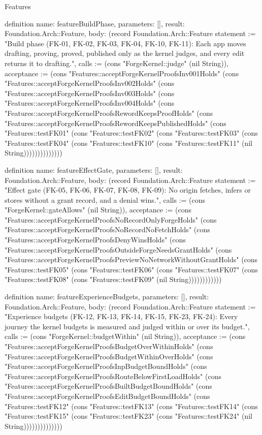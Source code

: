 \begin{lexlean}{Features}
\begin{semanticmodule}
definition{
  name: featureBuildPhase,
  parameters: [],
  result: Foundation.Arch::Feature,
  body: (record Foundation.Arch::Feature {statement := "Build phase (FK-01, FK-02, FK-03, FK-04, FK-10, FK-11): Each app moves drafting, proving, proved, published only as the kernel judges, and every edit returns it to drafting.", calls := (cons "ForgeKernel::judge" (nil String)), acceptance := (cons "Features::acceptForgeKernelProofsInv001Holds" (cons "Features::acceptForgeKernelProofsInv002Holds" (cons "Features::acceptForgeKernelProofsInv003Holds" (cons "Features::acceptForgeKernelProofsInv004Holds" (cons "Features::acceptForgeKernelProofsRewordKeepsProofHolds" (cons "Features::acceptForgeKernelProofsRewordKeepsPublishedHolds" (cons "Features::testFK01" (cons "Features::testFK02" (cons "Features::testFK03" (cons "Features::testFK04" (cons "Features::testFK10" (cons "Features::testFK11" (nil String)))))))))))))})
}

definition{
  name: featureEffectGate,
  parameters: [],
  result: Foundation.Arch::Feature,
  body: (record Foundation.Arch::Feature {statement := "Effect gate (FK-05, FK-06, FK-07, FK-08, FK-09): No origin fetches, infers or stores without a grant record, and a denial wins.", calls := (cons "ForgeKernel::gateAllows" (nil String)), acceptance := (cons "Features::acceptForgeKernelProofsNoRecordOnlyForgeHolds" (cons "Features::acceptForgeKernelProofsNoRecordNoFetchHolds" (cons "Features::acceptForgeKernelProofsDenyWinsHolds" (cons "Features::acceptForgeKernelProofsOutsideForgeNeedsGrantHolds" (cons "Features::acceptForgeKernelProofsPreviewNoNetworkWithoutGrantHolds" (cons "Features::testFK05" (cons "Features::testFK06" (cons "Features::testFK07" (cons "Features::testFK08" (cons "Features::testFK09" (nil String)))))))))))})
}

definition{
  name: featureExperienceBudgets,
  parameters: [],
  result: Foundation.Arch::Feature,
  body: (record Foundation.Arch::Feature {statement := "Experience budgets (FK-12, FK-13, FK-14, FK-15, FK-23, FK-24): Every journey the kernel budgets is measured and judged within or over its budget.", calls := (cons "ForgeKernel::budgetWithin" (nil String)), acceptance := (cons "Features::acceptForgeKernelProofsBudgetOverWithinHolds" (cons "Features::acceptForgeKernelProofsBudgetWithinOverHolds" (cons "Features::acceptForgeKernelProofsInpBudgetBoundHolds" (cons "Features::acceptForgeKernelProofsRouteBelowFirstLoadHolds" (cons "Features::acceptForgeKernelProofsBuiltBudgetBoundHolds" (cons "Features::acceptForgeKernelProofsEditBudgetBoundHolds" (cons "Features::testFK12" (cons "Features::testFK13" (cons "Features::testFK14" (cons "Features::testFK15" (cons "Features::testFK23" (cons "Features::testFK24" (nil String)))))))))))))})
}


\end{semanticmodule}
\end{lexlean}
